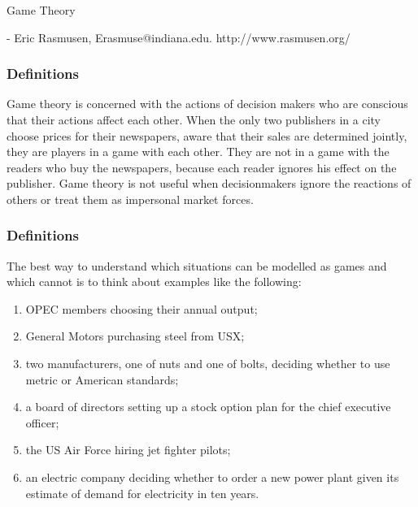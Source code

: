  \begin{frame}[fragile]\frametitle{}
\begin{center}
{\Large Game Theory}

 -   Eric Rasmusen, Erasmuse@indiana.edu. http://www.rasmusen.org/
\end{center}
\end{frame}


 \begin{frame}[fragile]\frametitle{Definitions}

Game theory is concerned with the actions of decision makers who are conscious
that their actions affect each other.  When the only two publishers in a city
choose prices for their newspapers, aware that their sales are determined
jointly, they are players in a game with each other. They are not in a game with
the readers who buy the newspapers, because each reader ignores his   effect on
the publisher. Game theory is not useful when decisionmakers ignore the
reactions of others or treat them as impersonal market forces.

\end{frame}

 \begin{frame}[fragile]\frametitle{Definitions}
 The best way to understand which situations can be modelled as games and which
cannot is to think about examples like  the following:
\begin{enumerate}
 \item
OPEC members choosing their annual output;

\item General Motors purchasing steel from USX;

\item two manufacturers, one of nuts and one of bolts, deciding whether to use
metric or American standards;

\item a board of directors setting up a stock option plan for the chief
executive officer;

\item the US Air Force hiring  jet fighter pilots;

\item an electric company deciding whether to order a new power plant given its
estimate of demand for electricity in ten years. \end{enumerate}
\end{frame}


